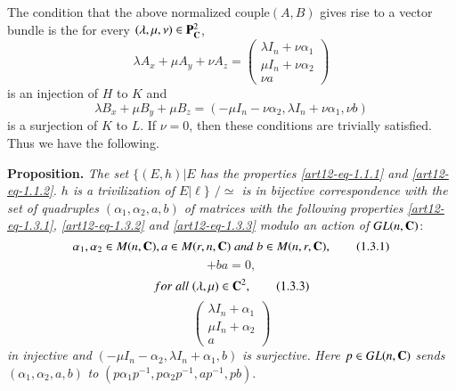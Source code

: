 The condition that the above normalized couple$(A, B)$ gives rise to a vector bundle is the for every $(\lambda, \mu, \nu) \in \mathbf{P}_{\mathbf{C}}^{2}$,
$$
\lambda A_{x}+ \mu A_{y} + \nu A_{z} = \begin{pmatrix}
\lambda I_{n} + \nu \alpha_{1}\\
\mu I_{n} +\nu\alpha_{2}\\
\nu a
\end{pmatrix}
$$
is an injection of $H$ to $K$ and
$$
\lambda B_{x} + \mu B_{y} + \mu B_{z} =(-\mu I_{n}-\nu \alpha_{2},\lambda I_{n} +\nu\alpha_{1}, \nu b)
$$
is a surjection of $K$ to $L$. If $\nu =0$, then these conditions are trivially satisfied. Thus we have the following.

\medskip
\noindent
{\bfseries {} Proposition.\label{art12-prop-1.3}} \textit{The set $\{(E, h) | E$ {\rm has the
properties} \eqref{art12-eq-1.1.1} {\rm and} \eqref{art12-eq-1.1.2}. $h$ {\rm is a trivilization of} $E|\ell\}$ $/\simeq$ is in bijective correspondence with the set of quadruples $(\alpha_{1}, \alpha_{2}, a,b)$ of matrices with the following properties \eqref{art12-eq-1.3.1}, \eqref{art12-eq-1.3.2} and \eqref{art12-eq-1.3.3} modulo an action of $GL(n, \mathbf{C})$}:
\begin{equation*}
\alpha_{1}, \alpha_{2} \in M (n, \mathbf{C}), a \in M (r, n, \mathbf{C}) \;and\; b\in M(n,r, \mathbf{C}), \tag{1.3.1}\label{art12-eq-1.3.1}
\end{equation*}\pageoriginale
\begin{equation*}
[\alpha_{1}, \alpha_{2}] + ba =0,\tag{1.3.2}\label{art12-eq-1.3.2}
\end{equation*}
\begin{equation*}
for \; all  \;(\lambda, \mu) \in \mathbf{C}^{2},\tag{1.3.3}\label{art12-eq-1.3.3}
\end{equation*}
$$
\begin{pmatrix}
\lambda I_{n} + \alpha_{1}\\
\mu I_{n} + \alpha_{2}\\
a
\end{pmatrix}
$$
\textit{in injective and} $(-\mu I_{n}-\alpha_{2}, \lambda I_{n} + \alpha_{1}, b)$ \textit{is surjective.}
\textit{Here} $p \in GL(n, \mathbf{C})$ \textit{sends} $(\alpha_{1}, \alpha_{2}, a, b)$ \textit{to} $(p\alpha_{1}p^{-1}, p\alpha_{2}p^{-1}, ap^{-1}, pb)$.

